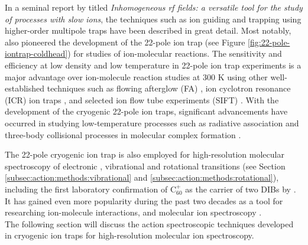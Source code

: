 In a seminal report by \citet{gerlich_inhomogeneous_1992} titled \emph{Inhomogeneous rf fields: a versatile tool for the study of processes with slow ions}, the techniques such as ion guiding and trapping using higher-order multipole traps have been described in great detail. Most notably, \citet{gerlich_ion-neutral_1995} also pioneered the development of the 22-pole ion trap (see Figure \ref{fig:22-pole-iontrap-coldhead}) for studies of ion-molecular reactions. The sensitivity and efficiency at low density and low temperature in 22-pole ion trap experiments is a major advantage over ion-molecule reaction studies at 300 K using other well-established techniques such as flowing afterglow (FA) \cite{fehsenfeld_thermalenergy_1967}, ion cyclotron resonance (ICR) ion traps \cite{kim_icr_1975}, and selected ion flow tube experiments (SIFT) \cite{smith_laboratory_1978}. With the development of the cryogenic 22-pole ion traps, significant advancements have occurred in studying low-temperature processes such as radiative association and three-body collisional processes in molecular complex formation \cite{gerlich_experimental_1992, paul_dynamics_1995, paul_deuteration_1996}.

The 22-pole cryogenic ion trap is also employed for high-resolution molecular spectroscopy of electronic \cite{chakrabarty_novel_2013, campbell_laboratory_2015}, vibrational \cite{asvany_understanding_2005} and rotational \cite{Brunken2017} transitions (see Section \ref{subsec:action:methods:vibrational} and \ref{subsec:action:methods:rotational}), including the first laboratory confirmation of C$_{60}^+$ as the carrier of two DIBs by \citet{campbell_laboratory_2015}. It has gained even more popularity during the past two decades as a tool for researching ion-molecule interactions, and molecular ion spectroscopy  \cite{redwine_novel_2013, asvany_coltrap_2014, gunther_berlintrap_2017, jusko_felion_2019, rap_low-temperature_2022}.\\

The following section will discuss the action spectroscopic techniques developed in cryogenic ion traps for high-resolution molecular ion spectroscopy.